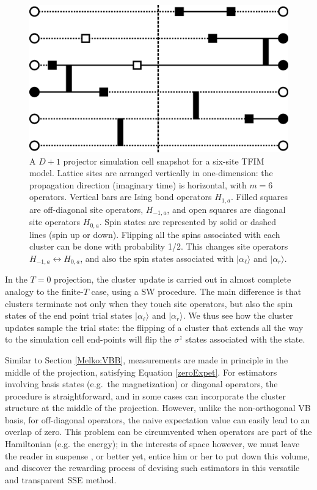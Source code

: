 \documentclass[vecphys]{svmult}
\begin{document}
\begin{figure}[t]
\centering
\includegraphics*[width=.85\textwidth]{zeroT_tfim.eps}
\caption[]{A $D+1$ projector simulation cell snapshot for a six-site TFIM model.  Lattice sites are arranged vertically in one-dimension: the propagation direction (imaginary time) is horizontal, with $m=6$ operators.  
Vertical bars are Ising bond operators $H_{1,a}$.  Filled squares are off-diagonal site operators, $H_{-1,a}$, and open squares are diagonal site operators $H_{0,a}$.
Spin states are represented by solid or dashed lines (spin up or down).  Flipping all the spins associated with each cluster can be done with probability 1/2.  This changes site operators $H_{-1,a} \leftrightarrow H_{0,a}$, and also the spin states associated with  $|\alpha_{\ell} \rangle$ and $|\alpha_r \rangle$.}
\label{Melko:fig:5}      
\end{figure} 

In the $T=0$ projection, the cluster update is carried out in almost complete analogy to the finite-$T$ case, using a SW procedure.  The main difference is that clusters terminate not only when they touch site operators, but also the spin states of the end point trial states $|\alpha_{\ell} \rangle$ and $|\alpha_r \rangle$.  We thus see how the cluster updates sample the trial state: the flipping of a cluster that extends all the way to the simulation cell end-points will flip the $\sigma^z$ states associated with the state. 

Similar to Section \ref{Melko:VBB}, measurements are made in principle in the middle of the projection, satisfying Equation \ref{zeroExpet}.  
For estimators involving basis states (e.g.~the magnetization) or diagonal operators, the procedure is straightforward, and in some cases can incorporate the cluster structure at the middle of the projection.
However, unlike the non-orthogonal VB basis, for off-diagonal operators, the naive expectation value can easily lead to an overlap of zero.  This problem can be circumvented when operators are part of the Hamiltonian (e.g. the energy); in the interests of space however, we must leave the reader in suspense \cite{Melko:unpub}, or better yet, entice him or her to put down this volume, and discover the rewarding process of devising such estimators in this versatile and transparent SSE method.
\end{document}

